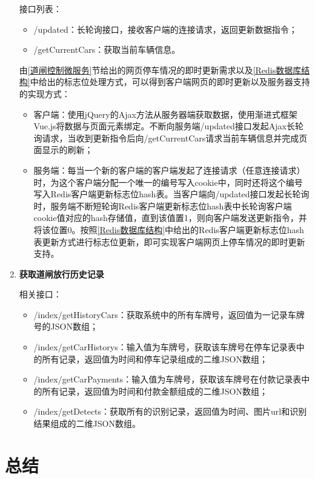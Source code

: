 \documentclass[a4paper]{ctexart}
\begin{document}
\begin{enumerate}[label=\bf{\arabic*、}]
	接口列表：
	\begin{itemize}
		\item /updated：长轮询接口，接收客户端的连接请求，返回更新数据指令；
		\item /getCurrentCars：获取当前车辆信息。
	\end{itemize}

	由\ref{道闸控制微服务}节给出的网页停车情况的即时更新需求以及\ref{Redis数据库结构}中给出的标志位处理方式，可以得到客户端网页的即时更新以及服务器支持的实现方式：

	\begin{itemize}
		\item 客户端：使用jQuery的Ajax方法从服务器端获取数据，使用渐进式框架Vue.js将数据与页面元素绑定。不断向服务端/updated接口发起Ajax长轮询请求，当收到更新指令后向/getCurrentCars请求当前车辆信息并完成页面显示的刷新；
		\item 服务端：每当一个新的客户端的客户端发起了连接请求（任意连接请求）时，为这个客户端分配一个唯一的编号写入cookie中，同时还将这个编号写入Redis客户端更新标志位hash表。当客户端向/updated接口发起长轮询时，服务端不断短轮询Redis客户端更新标志位hash表中长轮询客户端cookie值对应的hash存储值，直到该值置1，则向客户端发送更新指令，并将该位置0。按照\ref{Redis数据库结构}中给出的Redis客户端更新标志位hash表更新方式进行标志位更新，即可实现客户端网页上停车情况的即时更新支持。
	\end{itemize}

	\item {\bf 获取道闸放行历史记录}
	
	相关接口：
	\begin{itemize}
		\item /index/getHistoryCars：获取系统中的所有车牌号，返回值为一记录车牌号的JSON数组；
		\item /index/getCarHistorys：输入值为车牌号，获取该车牌号在停车记录表中的所有记录，返回值为时间和停车记录组成的二维JSON数组；
		\item /index/getCarPayments：输入值为车牌号，获取该车牌号在付款记录表中的所有记录，返回值为时间和付款金额组成的二维JSON数组；
		\item /index/getDetects：获取所有的识别记录，返回值为时间、图片url和识别结果组成的二维JSON数组。
	\end{itemize}
	
\end{enumerate}

\section{总结}
\end{document}
